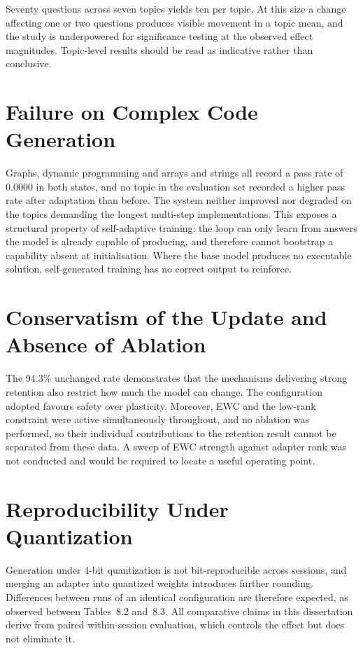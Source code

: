 \documentclass[12pt,a4paper]{report}
\begin{document}
Seventy questions across seven topics yields ten per topic. At this size a change affecting one or two questions produces visible movement in a topic mean, and the study is underpowered for significance testing at the observed effect magnitudes. Topic-level results should be read as indicative rather than conclusive.

\section{Failure on Complex Code Generation}

Graphs, dynamic programming and arrays and strings all record a pass rate of 0.0000 in both states, and no topic in the evaluation set recorded a higher pass rate after adaptation than before. The system neither improved nor degraded on the topics demanding the longest multi-step implementations. This exposes a structural property of self-adaptive training: the loop can only learn from answers the model is already capable of producing, and therefore cannot bootstrap a capability absent at initialisation. Where the base model produces no executable solution, self-generated training has no correct output to reinforce.

\section{Conservatism of the Update and Absence of Ablation}

The 94.3\% unchanged rate demonstrates that the mechanisms delivering strong retention also restrict how much the model can change. The configuration adopted favours safety over plasticity. Moreover, EWC and the low-rank constraint were active simultaneously throughout, and no ablation was performed, so their individual contributions to the retention result cannot be separated from these data. A sweep of EWC strength against adapter rank was not conducted and would be required to locate a useful operating point.

\section{Reproducibility Under Quantization}

Generation under 4-bit quantization is not bit-reproducible across sessions, and merging an adapter into quantized weights introduces further rounding. Differences between runs of an identical configuration are therefore expected, as observed between Tables~8.2 and~8.3. All comparative claims in this dissertation derive from paired within-session evaluation, which controls the effect but does not eliminate it.
\end{document}
